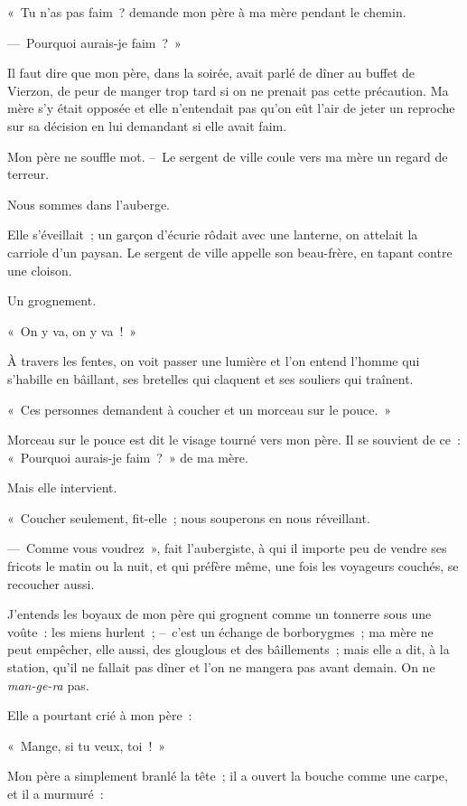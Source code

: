 \documentclass[french,twoside]{book} %
\begin{document}
« Tu n’as pas faim ? demande mon père à ma mère pendant le chemin.\par
— Pourquoi aurais-je faim ? »\par
Il faut dire que mon père, dans la soirée, avait parlé de dîner au buffet de Vierzon, de peur de manger trop tard si on ne prenait pas cette précaution. Ma mère s’y était opposée et elle n’entendait pas qu’on eût l’air de jeter un reproche sur sa décision en lui demandant si elle avait faim.\par
Mon père ne souffle mot. – Le sergent de ville coule vers ma mère un regard de terreur.\par
\bigbreak
\noindent Nous sommes dans l’auberge.\par
Elle s’éveillait ; un garçon d’écurie rôdait avec une lanterne, on attelait la carriole d’un paysan. Le sergent de ville appelle son beau-frère, en tapant contre une cloison.\par
Un grognement.\par
« On y va, on y va ! »\par
À travers les fentes, on voit passer une lumière et l’on entend l’homme qui s’habille en bâillant, ses bretelles qui claquent et ses souliers qui traînent.\par
« Ces personnes demandent à coucher et un morceau sur le pouce. »\par
Morceau sur le pouce est dit le visage tourné vers mon père. Il se souvient de ce : « Pourquoi aurais-je faim ? » de ma mère.\par
Mais elle intervient.\par
« Coucher seulement, fit-elle ; nous souperons en nous réveillant.\par
— Comme vous voudrez », fait l’aubergiste, à qui il importe peu de vendre ses fricots le matin ou la nuit, et qui préfère même, une fois les voyageurs couchés, se recoucher aussi.\par
J’entends les boyaux de mon père qui grognent comme un tonnerre sous une voûte : les miens hurlent ; – c’est un échange de borborygmes ; ma mère ne peut empêcher, elle aussi, des glouglous et des bâillements ; mais elle a dit, à la station, qu’il ne fallait pas dîner et l’on ne mangera pas avant demain. On ne \emph{man-ge-ra} pas.\par
Elle a pourtant crié à mon père :\par
« Mange, si tu veux, toi ! »\par
Mon père a simplement branlé la tête ; il a ouvert la bouche comme une carpe, et il a murmuré :\par
\end{document}
